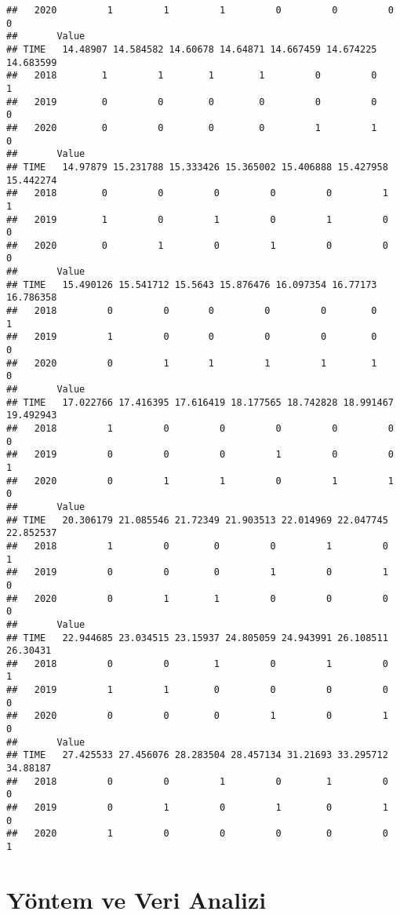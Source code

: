 \documentclass[
  12pt,
]{article}
\begin{document}
\begin{verbatim}
##   2020         1         1         1         0         0         0         0
##       Value
## TIME   14.48907 14.584582 14.60678 14.64871 14.667459 14.674225 14.683599
##   2018        1         1        1        1         0         0         1
##   2019        0         0        0        0         0         0         0
##   2020        0         0        0        0         1         1         0
##       Value
## TIME   14.97879 15.231788 15.333426 15.365002 15.406888 15.427958 15.442274
##   2018        0         0         0         0         0         1         1
##   2019        1         0         1         0         1         0         0
##   2020        0         1         0         1         0         0         0
##       Value
## TIME   15.490126 15.541712 15.5643 15.876476 16.097354 16.77173 16.786358
##   2018         0         0       0         0         0        0         1
##   2019         1         0       0         0         0        0         0
##   2020         0         1       1         1         1        1         0
##       Value
## TIME   17.022766 17.416395 17.616419 18.177565 18.742828 18.991467 19.492943
##   2018         1         0         0         0         0         0         0
##   2019         0         0         0         1         0         0         1
##   2020         0         1         1         0         1         1         0
##       Value
## TIME   20.306179 21.085546 21.72349 21.903513 22.014969 22.047745 22.852537
##   2018         1         0        0         0         1         0         1
##   2019         0         0        0         1         0         1         0
##   2020         0         1        1         0         0         0         0
##       Value
## TIME   22.944685 23.034515 23.15937 24.805059 24.943991 26.108511 26.30431
##   2018         0         0        1         0         1         0        1
##   2019         1         1        0         0         0         0        0
##   2020         0         0        0         1         0         1        0
##       Value
## TIME   27.425533 27.456076 28.283504 28.457134 31.21693 33.295712 34.88187
##   2018         0         0         1         0        1         0        0
##   2019         0         1         0         1        0         1        0
##   2020         1         0         0         0        0         0        1
\end{verbatim}

\hypertarget{yuxf6ntem-ve-veri-analizi}{%
\section{Yöntem ve Veri Analizi}\label{yuxf6ntem-ve-veri-analizi}}
\end{document}
